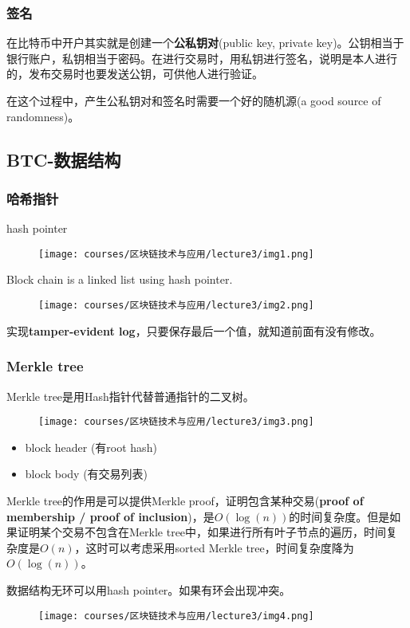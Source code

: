 \documentclass[10pt]{ctexart}
\begin{document}
\subsubsection{签名}
在比特币中开户其实就是创建一个\textbf{公私钥对}(public key, private key)。公钥相当于银行账户，私钥相当于密码。在进行交易时，用私钥进行签名，说明是本人进行的，发布交易时也要发送公钥，可供他人进行验证。

在这个过程中，产生公私钥对和签名时需要一个好的随机源(a good source of randomness)。
\subsection{BTC-数据结构}
\subsubsection{哈希指针}
hash pointer
\begin{figure}[H]
    \centering
    \texttt{[image: courses/区块链技术与应用/lecture3/img1.png]} 
\end{figure}
Block chain is a linked list using hash pointer.
\begin{figure}[H]
    \centering
    \texttt{[image: courses/区块链技术与应用/lecture3/img2.png]} 
\end{figure}

实现\textbf{tamper-evident log}，只要保存最后一个值，就知道前面有没有修改。
\subsubsection{Merkle tree}
Merkle tree是用Hash指针代替普通指针的二叉树。
\begin{figure}[H]
    \centering
    \texttt{[image: courses/区块链技术与应用/lecture3/img3.png]} 
\end{figure}
\begin{itemize}
    \item block header (有root hash)
    \item block body (有交易列表)
\end{itemize}
Merkle tree的作用是可以提供Merkle proof，证明包含某种交易(\textbf{proof of membership / proof of inclusion})，是$O(\log(n))$的时间复杂度。但是如果证明某个交易不包含在Merkle tree中，如果进行所有叶子节点的遍历，时间复杂度是$O(n)$，这时可以考虑采用sorted Merkle tree，时间复杂度降为$O(\log(n))$。
 
数据结构无环可以用hash pointer。如果有环会出现冲突。
\begin{figure}[H]
    \centering
    \texttt{[image: courses/区块链技术与应用/lecture3/img4.png]} 
\end{figure}
\end{document}
